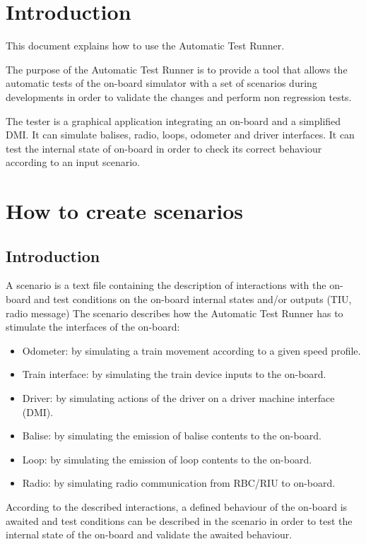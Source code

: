 \documentclass{template/openetcs}
\begin{document}

\section{Introduction}

This document explains how to use the Automatic Test Runner.

The purpose of the Automatic Test Runner is to provide a tool that allows the automatic tests of the on-board simulator with a set of scenarios during developments in order to validate the changes and perform non regression tests.

The tester is a graphical application integrating an on-board and a simplified DMI. It can simulate balises, radio, loops, odometer and driver interfaces. It can test the internal state of on-board in order to check its correct behaviour according to an input scenario.

\section{How to create scenarios}
\subsection{Introduction}

A scenario is a text file containing the description of interactions with the on-board and test conditions on the on-board internal states and/or outputs (TIU, radio message)
The scenario describes how the Automatic Test Runner has to stimulate the interfaces of the on-board:

\begin{itemize}
	\item Odometer: by simulating a train movement according to a given speed profile.
	\item Train interface: by simulating the train device inputs to the on-board.
	\item Driver: by simulating actions of the driver on a driver machine interface (DMI).
	\item Balise: by simulating the emission of balise contents to the on-board.
	\item Loop: by simulating the emission of loop contents to the on-board.
	\item Radio: by simulating radio communication from RBC/RIU to on-board.
\end{itemize}

According to the described interactions, a defined behaviour of the on-board is awaited and test conditions can be described in the scenario in order to test the internal state of the on-board and validate the awaited behaviour. 
\end{document}
